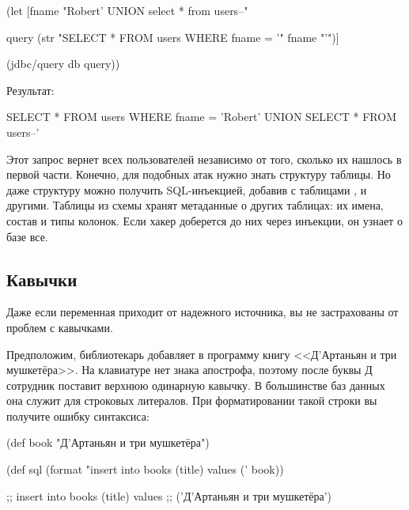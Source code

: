 \begin{english}
  \begin{clojure}
(let [fname
      "Robert' UNION select * from users--"

      query
      (str "SELECT * FROM users WHERE fname = '"
           fname
           "'")]

  (jdbc/query db query))
  \end{clojure}
\end{english}

Результат:

\begin{english}
  \begin{sql}
SELECT * FROM users WHERE fname = 'Robert'
UNION
SELECT * FROM users--'
  \end{sql}
\end{english}

Этот запрос вернет всех пользователей независимо от того, сколько их нашлось в первой части. Конечно, для подобных атак нужно знать структуру таблицы. Но даже структуру можно получить SQL-инъекцией, добавив  с таблицами ,  и другими. Таблицы из схемы  хранят метаданные о других таблицах: их имена, состав и типы колонок. Если хакер доберется до них через инъекции, он узнает о базе все.

\iflarge\vspace{3mm}\fi

\subsection{Кавычки}

Даже если переменная приходит от надежного источника, вы не застрахованы от проблем с кавычками.

Предположим, библиотекарь добавляет в программу книгу <<Д’Артаньян и три мушкетёра>>. На клавиатуре нет знака апострофа, поэтому после буквы Д сотрудник поставит верхнюю одинарную кавычку. В большинстве баз данных она служит для строковых литералов. При форматировании такой строки вы получите ошибку синтаксиса:

  \begin{clojure}
(def book "Д'Артаньян и три мушкетёра")

(def sql
  (format "insert into books (title) values ('%
          book))

;; insert into books (title) values
;; ('Д'Артаньян и три мушкетёра')
  \end{clojure}

